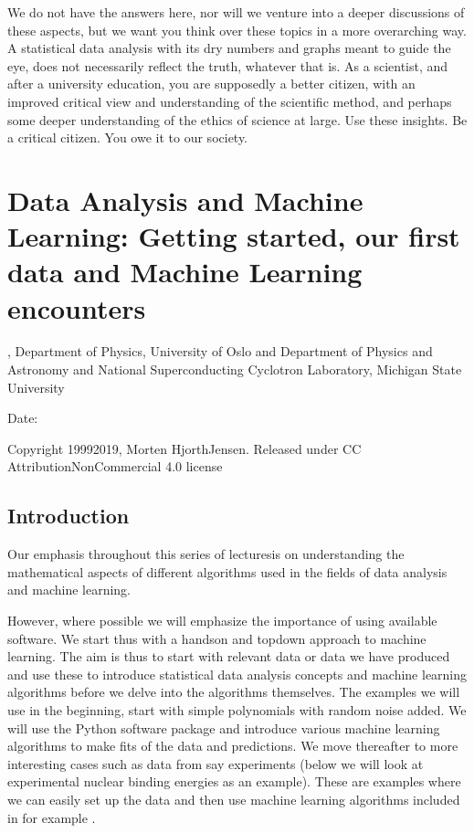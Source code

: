 \documentclass[letterpaper,10pt,english]{sphinxmanual}
\begin{document}
We do not have the answers here, nor will we venture into a deeper
discussions of these aspects, but we want you think over these topics
in a more overarching way.  A statistical data analysis with its dry
numbers and graphs meant to guide the eye, does not necessarily
reflect the truth, whatever that is.  As a scientist, and after a
university education, you are supposedly a better citizen, with an
improved critical view and understanding of the scientific method, and
perhaps some deeper understanding of the ethics of science at
large. Use these insights. Be a critical citizen. You owe it to our
society.




\section{Data Analysis and Machine Learning: Getting started, our first data and Machine Learning encounters}
\label{\detokenize{chapter2:data-analysis-and-machine-learning-getting-started-our-first-data-and-machine-learning-encounters}}\label{\detokenize{chapter2::doc}}




, Department of Physics, University of Oslo and Department of Physics and Astronomy and National Superconducting Cyclotron Laboratory, Michigan State University

Date: 

Copyright 1999\sphinxhyphen{}2019, Morten Hjorth\sphinxhyphen{}Jensen. Released under CC Attribution\sphinxhyphen{}NonCommercial 4.0 license


\subsection{Introduction}
\label{\detokenize{chapter2:introduction}}
Our emphasis throughout this series of lecturesis on understanding the mathematical aspects of
different algorithms used in the fields of data analysis and machine learning.

However, where possible we will emphasize the
importance of using available software. We start thus with a hands\sphinxhyphen{}on
and top\sphinxhyphen{}down approach to machine learning. The aim is thus to start with
relevant data or data we have produced
and use these to introduce statistical data analysis
concepts and machine learning algorithms before we delve into the
algorithms themselves. The examples we will use in the beginning, start with simple
polynomials with random noise added. We will use the Python
software package  and
introduce various machine learning algorithms to make fits of
the data and predictions. We move thereafter to more interesting
cases such as data from say experiments (below we will look at experimental nuclear binding energies as an example).
These are examples where we can easily set up the data and
then use machine learning algorithms included in for example
.
\end{document}

